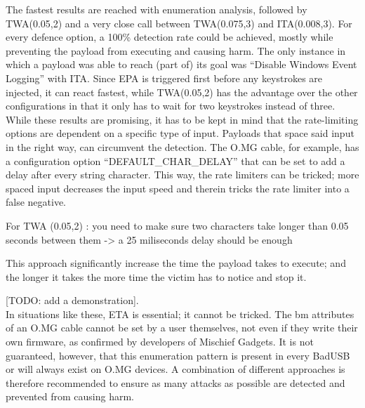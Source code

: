 The fastest results are reached with enumeration analysis, followed by TWA(0.05,2) and a very close call between TWA(0.075,3) and ITA(0.008,3). For every defence option, a 100\% detection rate could be achieved, mostly while preventing the payload from executing and causing harm. The only instance in which a payload was able to reach (part of) its goal was ``Disable Windows Event Logging'' with ITA. Since EPA is triggered first before any keystrokes are injected, it can react fastest, while TWA(0.05,2) has the advantage over the other configurations in that it only has to wait for two keystrokes instead of three. \\
While these results are promising, it has to be kept in mind that the rate-limiting options are dependent on a specific type of input. Payloads that space said input in the right way, can circumvent the detection. The O.MG cable, for example, has a configuration option ``DEFAULT\_CHAR\_DELAY'' that can be set to add a delay after every string character. This way, the rate limiters can be tricked; more spaced input decreases the input speed and therein tricks the rate limiter into a false negative. 


For TWA (0.05,2) : you need to make sure two characters take longer than 0.05 seconds between them -> a 25 miliseconds delay should be enough 

This approach significantly increase the time the payload takes to execute; and the longer it takes the more time the victim has to notice and stop it. 

[TODO: add a demonstration]. \\
In situations like these, ETA is essential; it cannot be tricked. The bm attributes of an O.MG cable cannot be set by a user themselves, not even if they write their own firmware, as confirmed by developers of Mischief Gadgets. It is not guaranteed, however, that this enumeration pattern is present in every BadUSB or will always exist on O.MG devices. A combination of different approaches is therefore recommended to ensure as many attacks as possible are detected and prevented from causing harm. 

